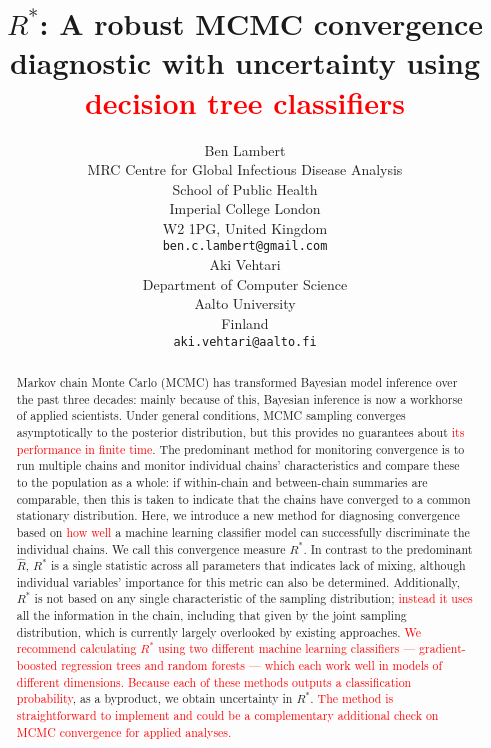 \documentclass{article}
\title{$R^*$: A robust MCMC convergence diagnostic with uncertainty using \textcolor{red}{decision tree classifiers}}
\author{%
	 Ben Lambert\\
	 MRC Centre for Global Infectious Disease Analysis\\
	 School of Public Health\\
	 Imperial College London\\
	 W2 1PG, United Kingdom\\
	 \texttt{ben.c.lambert@gmail.com} \\
	 \And
	 Aki Vehtari \\
	 Department of Computer Science\\
	 Aalto University\\
	 Finland\\
	 \texttt{aki.vehtari@aalto.fi}
}
\begin{document}

\maketitle

\begin{abstract}
	Markov chain Monte Carlo (MCMC) has transformed Bayesian model inference over the past three decades: mainly because of this, Bayesian inference is now a workhorse of applied scientists. Under general conditions, MCMC sampling converges asymptotically to the posterior distribution, but this provides no guarantees about \textcolor{red}{its performance in finite time}. The predominant method for monitoring convergence is to run multiple chains and monitor individual chains' characteristics and compare these to the population as a whole: if within-chain and between-chain summaries are comparable, then this is taken to indicate that the chains have converged to a common stationary distribution. Here, we introduce a new method for diagnosing convergence based on \textcolor{red}{how well} a machine learning classifier model can successfully discriminate the individual chains. We call this convergence measure $R^*$. In contrast to the predominant $\widehat{R}$, $R^*$ is a single statistic across all parameters that indicates lack of mixing, although individual variables' importance for this metric can also be determined. Additionally, $R^*$ is not based on any single characteristic of the sampling distribution; \textcolor{red}{instead it uses} all the information in the chain, including that given by the joint sampling distribution, which is currently largely overlooked by existing approaches. \textcolor{red}{We recommend calculating $R^*$ using two different machine learning classifiers — gradient-boosted regression trees and random forests — which each work well in models of different dimensions. Because each of these methods outputs a classification probability}, as a byproduct, we obtain uncertainty in $R^*$. \textcolor{red}{The method is straightforward to implement and could be a complementary additional check on MCMC convergence for applied analyses.}
\end{abstract}
\end{document}
